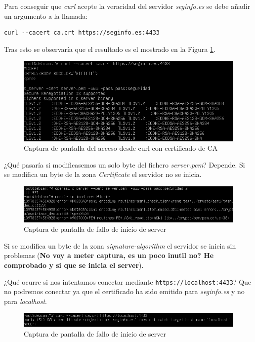 \documentclass[10pt,a4paper]{article}
\begin{document}
Para conseguir que \emph{curl} acepte la veracidad del servidor \emph{seginfo.es} se debe añadir un argumento a la llamada:\\


\begin{lstlisting}
curl --cacert ca.crt https://seginfo.es:4433
\end{lstlisting}

Tras esto se observaría que el resultado es el mostrado en la Figura \ref{fig:tarea3_paso3}.

\begin{figure}[h!]
\centering
\includegraphics[scale=0.6]{images/tarea3_paso3.png}
\caption{Captura de pantalla del acceso desde curl con certificado de CA}
\label{fig:tarea3_paso3}
\end{figure}


¿Qué pasaría si modificasemos un solo byte del fichero \emph{server.pem}? Depende. Si se modifica un byte de la zona \emph{Certificate} el servidor no se inicia.\\

\begin{figure}[h!]
	\centering
	\includegraphics[scale=0.6]{images/tarea3_fallo_inicio_server.png}
	\caption{Captura de pantalla de fallo de inicio de server}
	\label{fig:tarea3_fallo_inicio_server}
\end{figure}
 Si se modifica un byte de la zona \emph{signature-algorithm} el servidor se inicia sin problemas (\textbf{No voy a meter captura, es un poco inutil no? He comprobado y si que se inicia el server}).

¿Qué ocurre si nos intentamos conectar mediante \texttt{https://localhost:4433}? Que no podremos conectar ya que el certificado ha sido emitido para \emph{seginfo.es} y no para \emph{localhost}.
\begin{figure}[h!]
	\centering
	\includegraphics[scale=0.6]{images/tarea4_paso2.png}
	\caption{Captura de pantalla de fallo de inicio de server}
	\label{fig:tarea3_localhost}
\end{figure}
\end{document}
